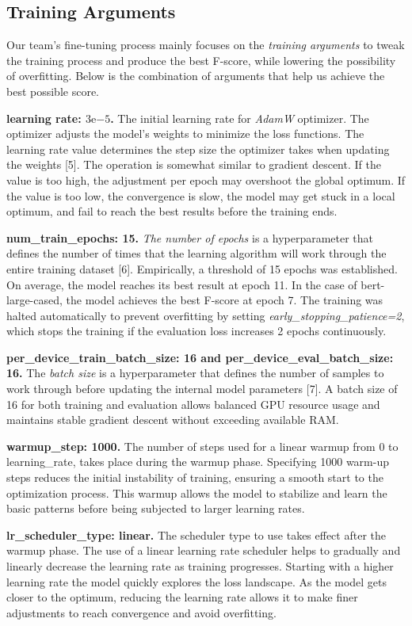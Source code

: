 \documentclass[11pt]{article}
\begin{document}
\subsection{Training Arguments}
Our team’s fine-tuning process mainly focuses on the \textit{training arguments} to tweak the training process and produce the best F-score, while lowering the possibility of overfitting. Below is the combination of arguments that help us achieve the best possible score. 

\textbf{learning rate: $3\mathrm{e}{-5}$.} The initial learning rate for \textit{AdamW} optimizer. The optimizer adjusts the model’s weights to minimize the loss functions. The learning rate value determines the step size the optimizer takes when updating the weights [5]. The operation is somewhat similar to gradient descent. If the value is too high, the adjustment per epoch may overshoot the global optimum. If the value is too low, the convergence is slow, the model may get stuck in a local optimum, and fail to reach the best results before the training ends. 

\textbf{num\_train\_epochs: 15.} \textit{The number of epochs} is a hyperparameter that defines the number of times that the learning algorithm will work through the entire training dataset [6]. Empirically, a threshold of 15 epochs was established. On average, the model reaches its best result at epoch 11. In the case of bert-large-cased, the model achieves the best F-score at epoch 7. The training was halted automatically to prevent overfitting by setting \textit{early\_stopping\_patience=2}, which stops the training if the evaluation loss increases 2 epochs continuously. 

\textbf{per\_device\_train\_batch\_size: 16 and per\_device\_eval\_batch\_size: 16.} The \textit{batch size} is a hyperparameter that defines the number of samples to work through before updating the internal model parameters [7]. A batch size of 16 for both training and evaluation allows balanced GPU resource usage and maintains stable gradient descent without exceeding available RAM.

\textbf{warmup\_step: 1000.} The number of steps used for a linear warmup from 0 to learning\_rate, takes place during the warmup phase. Specifying 1000 warm-up steps reduces the initial instability of training, ensuring a smooth start to the optimization process. This warmup allows the model to stabilize and learn the basic patterns before being subjected to larger learning rates.

\textbf{lr\_scheduler\_type: linear. }The scheduler type to use takes effect after the warmup phase. The use of a linear learning rate scheduler helps to gradually and linearly decrease the learning rate as training progresses. Starting with a higher learning rate the model quickly explores the loss landscape. As the model gets closer to the optimum, reducing the learning rate allows it to make finer adjustments to reach convergence and avoid overfitting.
\end{document}
